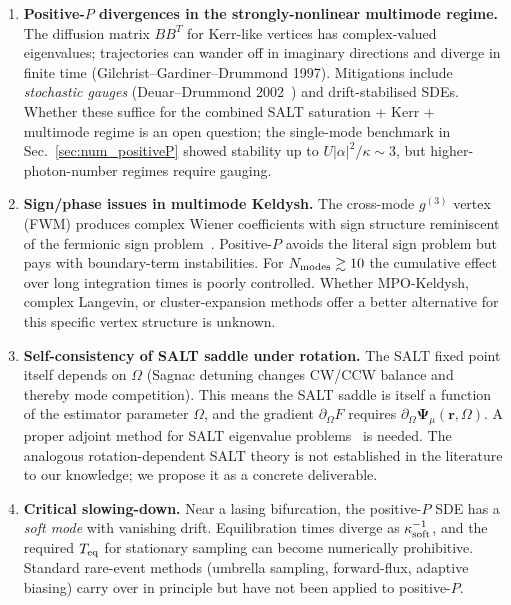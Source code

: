 \documentclass[11pt]{article}
\begin{document}
\begin{enumerate}\itemsep0.3em

\item\textbf{Positive-$P$ divergences in the strongly-nonlinear
  multimode regime.}  The diffusion matrix $BB^T$ for Kerr-like
  vertices has complex-valued eigenvalues; trajectories can wander off
  in imaginary directions and diverge in finite time
  (Gilchrist--Gardiner--Drummond 1997).
  Mitigations include \emph{stochastic gauges} (Deuar--Drummond
  2002~\cite{DeuarDrummond2002}) and drift-stabilised SDEs.
  Whether these suffice for the combined SALT saturation + Kerr +
  multimode regime is an open question; the single-mode benchmark in
  Sec.~\ref{sec:num_positiveP} showed stability up to
  $U|\alpha|^2/\kappa\sim 3$, but higher-photon-number regimes
  require gauging.

\item\textbf{Sign/phase issues in multimode Keldysh.}  The
  cross-mode $g^{(3)}$ vertex (FWM) produces complex Wiener coefficients
  with sign structure reminiscent of the fermionic sign
  problem~\cite{Troyer2005}.  Positive-$P$ avoids the literal sign
  problem but pays with boundary-term instabilities.  For
  $N_{\rm modes}\gtrsim 10$ the cumulative effect over long integration
  times is poorly controlled.  Whether MPO-Keldysh, complex Langevin,
  or cluster-expansion methods offer a better alternative for
  this specific vertex structure is unknown.

\item\textbf{Self-consistency of SALT saddle under rotation.}  The SALT
  fixed point itself depends on $\Omega$ (Sagnac detuning changes CW/CCW
  balance and thereby mode competition).  This means the SALT saddle is
  itself a function of the estimator parameter $\Omega$, and the
  gradient $\partial_\Omega F$ requires $\partial_\Omega
  \mathbf{\Psi}_\mu(\mathbf{r},\Omega)$.  A proper adjoint method for
  SALT eigenvalue problems~\cite{AhnetalAdjoint2020} is needed.  The
  analogous rotation-dependent SALT theory is not established in the
  literature to our knowledge; we propose it as a concrete deliverable.

\item\textbf{Critical slowing-down.}  Near a lasing bifurcation, the
  positive-$P$ SDE has a \emph{soft mode} with vanishing drift.
  Equilibration times diverge as $\kappa_{\rm soft}^{-1}$, and the
  required $T_{\rm eq}$ for stationary sampling can become
  numerically prohibitive.  Standard rare-event methods (umbrella
  sampling, forward-flux, adaptive biasing) carry over in principle
  but have not been applied to positive-$P$.


\end{enumerate}
\end{document}
